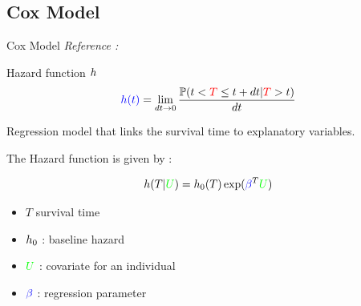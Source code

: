 \documentclass[10pt,xcolor={dvipsnames}]{beamer}
\begin{document}
\subsection{Cox Model}
\begin{frame}{Cox Model}
    \textit{Reference :} \cite{cox_regression_1972}
    
    \centering
    \begin{minipage}{0.8\textwidth}
        \begin{block}{Hazard function $h$}
            $$\textcolor{blue}{h(t)} = \lim_{dt\to 0} \frac {\mathbb P (t < \textcolor{red}{T} \leq t + dt | \textcolor{red}{T} > t)}{dt}$$
        \end{block}
    \end{minipage}

    \begin{minipage}{0.8\textwidth}
        \begin{block}{}
            Regression model that links the survival time to explanatory variables.
            
            The Hazard function is given by :
            
            $$h(T | \textcolor{green}{U})  = h_0(T) \exp(\textcolor{blue}{\beta}^T \textcolor{green}{U} )$$
        
            \begin{itemize}
                \item $T$ survival time 
                \item $h_0$ : baseline hazard
                \item $\textcolor{green}{U}$ : covariate for an individual
                \item $\textcolor{blue}{\beta}$ : regression parameter
            \end{itemize}
        
        \end{block}
    \end{minipage}
\end{frame}
\end{document}
